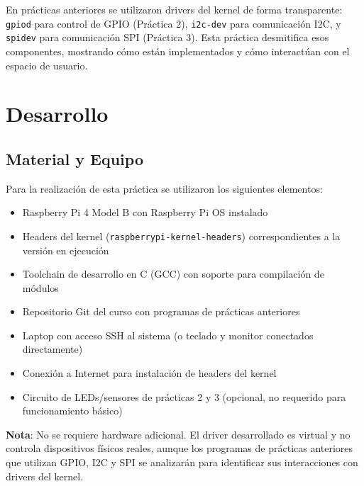 \documentclass[conference]{IEEEtran}
\begin{document}
En prácticas anteriores se utilizaron drivers del kernel de forma transparente: \texttt{gpiod} para control de GPIO (Práctica 2), \texttt{i2c-dev} para comunicación I2C, y \texttt{spidev} para comunicación SPI (Práctica 3). Esta práctica desmitifica esos componentes, mostrando cómo están implementados y cómo interactúan con el espacio de usuario.

\section{Desarrollo}

\subsection{Material y Equipo}

Para la realización de esta práctica se utilizaron los siguientes elementos:

\begin{itemize}
	\item Raspberry Pi 4 Model B con Raspberry Pi OS instalado
	\item Headers del kernel (\texttt{raspberrypi-kernel-headers}) correspondientes a la versión en ejecución
	\item Toolchain de desarrollo en C (GCC) con soporte para compilación de módulos
	\item Repositorio Git del curso con programas de prácticas anteriores
	\item Laptop con acceso SSH al sistema (o teclado y monitor conectados directamente)
	\item Conexión a Internet para instalación de headers del kernel
	\item Circuito de LEDs/sensores de prácticas 2 y 3 (opcional, no requerido para funcionamiento básico)
\end{itemize}

\textbf{Nota}: No se requiere hardware adicional. El driver desarrollado es virtual y no controla dispositivos físicos reales, aunque los programas de prácticas anteriores que utilizan GPIO, I2C y SPI se analizarán para identificar sus interacciones con drivers del kernel.
\end{document}
